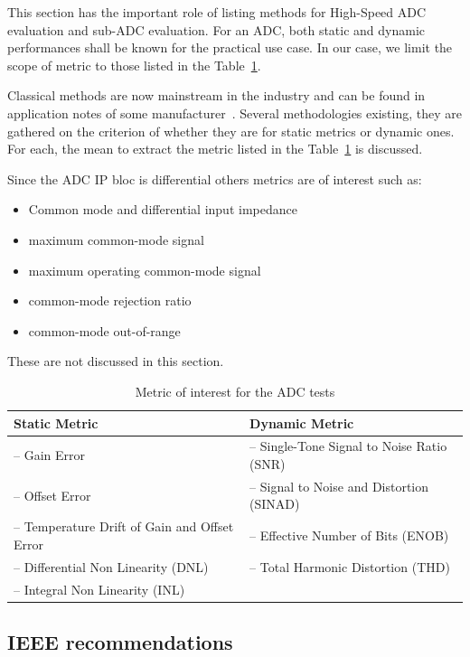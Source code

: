 This section has the important role of listing methods for High-Speed ADC evaluation and sub-ADC evaluation. For an ADC, both static and dynamic performances shall be known for the practical use case. In our case, we limit the scope of metric to those listed in the Table~\ref{tbl:adc-metric-subset}.

Classical methods are now mainstream in the industry and can be found in application notes of some manufacturer~\cite{AD-AN835,TI-SBAA002A,AD-DCH2005}. Several methodologies existing, they are gathered on the criterion of whether they are for static metrics or dynamic ones. For each, the mean to extract the metric listed in the Table~\ref{tbl:adc-metric-subset} is discussed.

Since the ADC IP bloc is differential others metrics are of interest such as:
\begin{itemize}
    \item Common mode and differential input impedance
    \item maximum common-mode signal
    \item maximum operating common-mode signal
    \item common-mode rejection ratio
    \item common-mode out-of-range
\end{itemize}
These are not discussed in this section.

\begin{table}[htp]
    \centering
    \caption{Metric of interest for the ADC tests}
    \label{tbl:adc-metric-subset}
    \begin{tabular}{l|l}
        \toprule
        \textbf{Static Metric} & \textbf{Dynamic Metric} \\ \midrule
        -- Gain Error & -- Single-Tone Signal to Noise Ratio (SNR)\\
        -- Offset Error & -- Signal to Noise and Distortion (SINAD)\\
        -- Temperature Drift of Gain and Offset Error & -- Effective Number of Bits (ENOB)\\
        -- Differential Non Linearity (DNL) & -- Total Harmonic Distortion (THD) \\
        -- Integral Non Linearity (INL) & \\ \bottomrule
    \end{tabular}
\end{table}

\subsection{IEEE recommendations}
